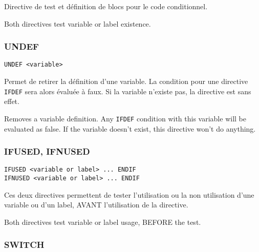 \begin{xfr}
Directive de test et définition de blocs pour le code conditionnel.
\end{xfr}

\begin{xen}
Both directives test variable or label existence.
\end{xen}

\subsubsection{UNDEF}
\begin{verbatim}
UNDEF <variable>
\end{verbatim}

\begin{xfr}
Permet de retirer la définition d'une variable.
La condition pour une directive \texttt{IFDEF} sera alors évaluée à faux.
Si la variable n'existe pas, la directive est sans effet.
\end{xfr}

\begin{xen}
Removes a variable definition. Any \texttt{IFDEF} condition with this variable will be evaluated as false.
If the variable doesn't exist, this directive won't do anything.
\end{xen}

\subsubsection{IFUSED, IFNUSED}
\begin{verbatim}
IFUSED <variable or label> ... ENDIF
IFNUSED <variable or label> ... ENDIF
\end{verbatim}

\begin{xfr}
Ces deux directives permettent de tester l'utilisation ou la non utilisation d'une variable ou d'un label, AVANT l'utilisation de la directive.
\end{xfr}

\begin{xen}
Both directives test variable or label usage, BEFORE the test.
\end{xen}

\subsubsection{SWITCH}

